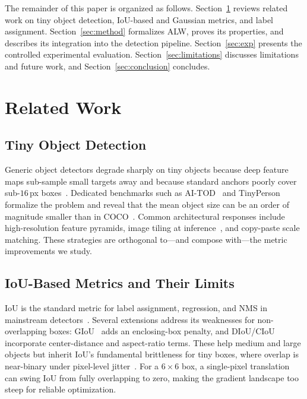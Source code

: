 \documentclass[journal]{IEEEtran}
\begin{document}
The remainder of this paper is organized as follows. Section~\ref{sec:related}
reviews related work on tiny object detection, IoU-based and Gaussian metrics,
and label assignment. Section~\ref{sec:method} formalizes ALW, proves its
properties, and describes its integration into the detection pipeline.
Section~\ref{sec:exp} presents the controlled experimental evaluation.
Section~\ref{sec:limitations} discusses limitations and future work, and
Section~\ref{sec:conclusion} concludes.

\section{Related Work}
\label{sec:related}

\subsection{Tiny Object Detection}

Generic object detectors degrade sharply on tiny objects because deep feature
maps sub-sample small targets away and because standard anchors poorly cover
sub-$16$\,px boxes~\cite{wang2021aitod}. Dedicated benchmarks such as
AI-TOD~\cite{wang2021aitod,xu2022aitodv2nwd} and
TinyPerson~\cite{yu2020tinyperson} formalize the problem and reveal that the
mean object size can be an order of magnitude smaller than in COCO~\cite{lin2014coco}.
Common architectural responses include high-resolution feature pyramids,
image tiling at inference~\cite{akyon2022sahi}, and copy-paste scale
matching. These strategies are orthogonal to---and compose with---the metric
improvements we study.

\subsection{IoU-Based Metrics and Their Limits}

IoU is the standard metric for label assignment, regression, and NMS in
mainstream detectors~\cite{ren2015faster,lin2017fpn}. Several extensions
address its weaknesses for non-overlapping boxes: GIoU~\cite{rezatofighi2019giou}
adds an enclosing-box penalty, and DIoU/CIoU~\cite{zheng2020diou} incorporate
center-distance and aspect-ratio terms. These help medium and large objects
but inherit IoU's fundamental brittleness for tiny boxes, where overlap is
near-binary under pixel-level jitter~\cite{wang2021nwd}. For a $6\times6$ box,
a single-pixel translation can swing IoU from fully overlapping to zero,
making the gradient landscape too steep for reliable optimization.
\end{document}
